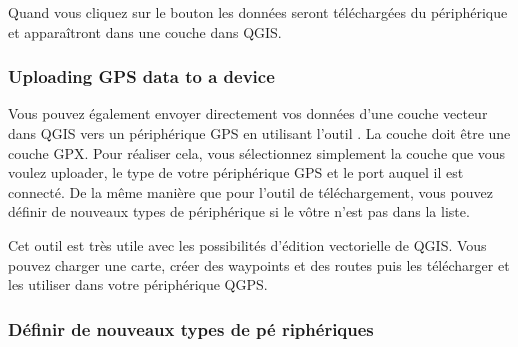 Quand vous cliquez sur le bouton  les donn\'ees seront t\'el\'echarg\'ees du
p\'eriph\'erique et appara\^itront dans une couche dans QGIS.

\subsubsection{Uploading GPS data to a device}

Vous pouvez \'egalement envoyer directement vos donn\'ees d'une couche vecteur 
dans QGIS vers un p\'eriph\'erique GPS en utilisant l'outil .
La couche doit \^etre une couche GPX.
Pour r\'ealiser cela, vous s\'electionnez simplement la couche que vous voulez 
uploader, le type de votre p\'eriph\'erique GPS et le port auquel il est connect\'e.
De la m\^eme mani\`ere que pour l'outil de t\'el\'echargement, vous pouvez d\'efinir de 
nouveaux types de p\'eriph\'erique si le v\^otre n'est pas dans la liste.

Cet outil est tr\`es utile avec les possibilit\'es d'\'edition vectorielle de QGIS. 
Vous pouvez charger une carte, cr\'eer des waypoints et des routes puis les
t\'el\'echarger et les utiliser dans votre p\'eriph\'erique QGPS.

\subsubsection{\label{sec:Defining-new-device}D\'efinir de nouveaux types de p\'e
riph\'eriques}

